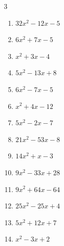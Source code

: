 \begin{multicols}{3}
\begin{enumerate}
\columnbreak %

\resetques

  \item $32x^{2}-12x-5$

        \phantom{$=(8x-5)(4x+1)$}

  \item $6x^{2}+7x-5$

        \phantom{$=(3x+5)(2x-1)$}

  \item $x^{2}+3x-4$

        \phantom{$=(x-1)(x+4)$}

  \item $5x^{2}-13x+8$

        \phantom{$=(x-1)(5x-8)$}

  \item $6x^{2}-7x-5$

        \phantom{$=(2x+1)(3x-5)$}

  \item $x^{2}+4x-12$

        \phantom{$=(x+6)(x-2)$}

  \item $5x^{2}-2x-7$

        \phantom{$=(x+1)(5x-7)$}

  \item $21x^{2}-53x-8$

        \phantom{$=(7x+1)(3x-8)$}

  \item $14x^{2}+x-3$

        \phantom{$=(2x+1)(7x-3)$}

  \item $9x^{2}-33x+28$

        \phantom{$=(3x-4)(3x-7)$}

\columnbreak %

  \item $9x^{2}+64x-64$

        \phantom{$=(x+8)(9x-8)$}

  \item $25x^{2}-25x+4$

        \phantom{$=(5x-1)(5x-4)$}

  \item $5x^{2}+12x+7$

        \phantom{$=(x+1)(5x+7)$}

  \item $x^{2}-3x+2$

        \phantom{$=(x-2)(x-1)$}


\end{enumerate}
\end{multicols}
